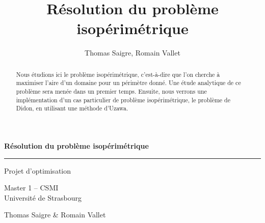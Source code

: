 \documentclass[10pt,a4paper]{article}
\title{Résolution du problème isopérimétrique}
\author{Thomas Saigre, Romain Vallet}
\theoremstyle{plain}
\theoremstyle{definition}
\begin{document}
\renewcommand{\proofname}{\textbf{Preuve}}



\thispagestyle{empty}



\begin{center}

{\LARGE \textsf{\textbf{Résolution du problème isopérimétrique\\}}}
\rule{\linewidth}{0.5mm}

\vspace{2\baselineskip}

{\Large Projet d'optimisation}

\vspace{\baselineskip}

{\Large Master 1 -- CSMI \\ \vspace{0.5\baselineskip} Université de Strasbourg}

\vspace{2\baselineskip}

{\sf \Large Thomas Saigre \& Romain Vallet}

\vspace{2\baselineskip}

\end{center}







\newpage

\begin{abstract}
Nous étudions ici le problème isopérimétrique, c'est-à-dire que l'on cherche à maximiser l'aire d'un domaine pour un périmètre donné. Une étude analytique de ce problème sera menée dans un premier temps. Ensuite, nous verrons une implémentation d'un cas particulier de problème isopérimétrique, le problème de Didon, en utilisant une méthode d'Uzawa.
\end{abstract}




\end{document}
